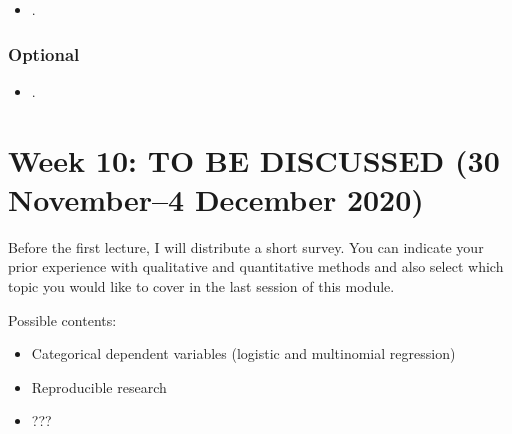 \documentclass[abstract=on,parskip=full,headings=standardclasses,fontsize=11pt,paper=a4]{scrartcl}
\begin{document}
\begin{itemize}
\item {}.
\end{itemize}

\subsubsection*{Optional}
\begin{itemize}
\item {}.
\end{itemize}


 
\section{Week 10: TO BE DISCUSSED  (30 November--4 December 2020)}

Before the first lecture, I will distribute a short survey. You can indicate your prior experience with qualitative and quantitative methods and also select which topic you would like to cover in the last session of this module. 

Possible contents: 

\begin{itemize}
\item Categorical dependent variables (logistic and multinomial regression)
\item Reproducible research
\item ???
\end{itemize}

\newpage
\sloppy
\renewcommand*{\bibfont}{\small}
\onehalfspacing
\setlength{\bibitemsep}{0.2em} %
\printbibliography
\end{document}

